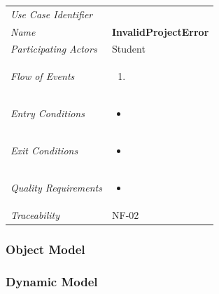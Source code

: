 \documentclass[12pt,letterpaper]{article}
\begin{document}
\begin{center}
	\begin{tabu} to 
		\toprule
		Use Case Identifier & \invalidprojecterror{} \\
		Name & {\bf InvalidProjectError} \\
		Participating Actors & Student \\
		Flow of Events & 
	    \begin{enumerate}[topsep=-1em, leftmargin=*]
		    \item 
		\end{enumerate} \\

		Entry Conditions &
		\begin{itemize}[topsep=-1em, leftmargin=*]
		    \item 
        \end{itemize} \\

		Exit Conditions &
		\begin{itemize}[topsep=-1em, leftmargin=*]
		    \item 
        \end{itemize} \\

		Quality Requirements &
		\begin{itemize}[topsep=-1em, leftmargin=*]
		    \item 
        \end{itemize} \\

		Traceability & NF-02 \\
		\toprule
	\end{tabu}
\end{center}

\subsubsection{Object Model}


\subsubsection{Dynamic Model}
\end{document}
